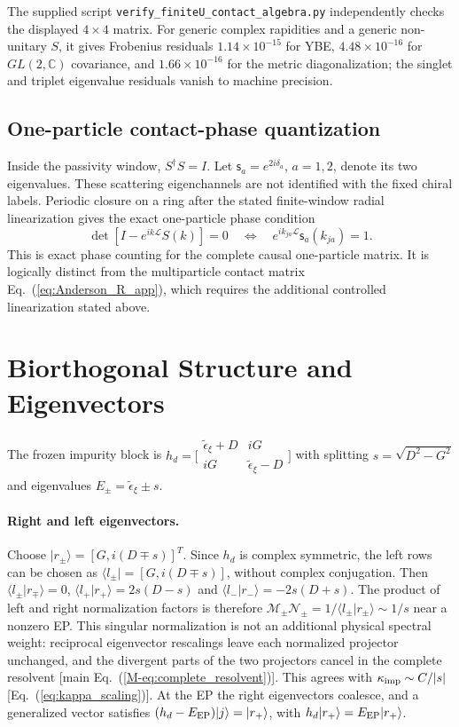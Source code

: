 \documentclass[%
  aps,physrev,onecolumn,10pt,amsmath,amssymb,superscriptaddress,longbibliography,floatfix
]{revtex4-2}
\newcommand{\teps}{\tilde{\epsilon}_{\xi}}
\newcommand{\keff}{\kappa_{\rm imp}}
\begin{document}
The supplied script \nolinkurl{verify_finiteU_contact_algebra.py} independently
checks the displayed \(4\times4\) matrix.  For generic complex rapidities and
a generic non-unitary \(S\), it gives Frobenius residuals
\(1.14\times10^{-15}\) for YBE,
\(4.48\times10^{-16}\) for \(GL(2,\mathbb C)\) covariance, and
\(1.66\times10^{-16}\) for the metric diagonalization; the singlet and triplet
eigenvalue residuals vanish to machine precision.

\subsection{One-particle contact-phase quantization}

Inside the passivity window, $S^\dagger S=I$.  Let
$\mathsf{s}_a=e^{2i\delta_a}$, $a=1,2$, denote its two eigenvalues.
These scattering eigenchannels are not identified with the fixed chiral
labels.  Periodic closure on a ring after the stated finite-window radial
linearization gives the exact one-particle phase condition
\begin{equation}
\det[I-e^{ik\mathcal L}S(k)]=0
\quad\Longleftrightarrow\quad
e^{ik_{ja}\mathcal L}\mathsf{s}_a(k_{ja})=1 .
\label{eq:S_full_quantization}
\end{equation}
This is exact phase counting for the complete causal one-particle matrix.
It is logically distinct from the multiparticle contact matrix
Eq.~(\ref{eq:Anderson_R_app}), which requires the additional controlled
linearization stated above.

\section{Biorthogonal Structure and Eigenvectors}
\label{app:biorth}

The frozen impurity block is
$h_d=\bigl[\begin{smallmatrix}
\teps+D&iG\\iG&\teps-D\end{smallmatrix}\bigr]$
with splitting $s=\sqrt{D^2-G^2}$ and eigenvalues
$E_\pm=\teps\pm s$.

\paragraph{Right and left eigenvectors.}
Choose $|r_\pm\rangle=[G,i(D\mp s)]^T$.  Since $h_d$ is complex
symmetric, the left rows can be chosen as
$\langle l_\pm|=[G,i(D\mp s)]$, without complex conjugation.
Then $\langle l_\pm|r_\mp\rangle=0$,
$\langle l_+|r_+\rangle=2s(D-s)$ and $\langle l_-|r_-\rangle=-2s(D+s)$.
The product of left and right normalization factors is therefore $\mathcal M_\pm\mathcal N_\pm=1/\langle l_\pm|r_\pm\rangle\sim1/s$
near a nonzero EP.  This singular normalization is not an additional physical
spectral weight: reciprocal eigenvector rescalings leave each normalized
projector unchanged, and the divergent parts of the two projectors cancel in
the complete resolvent [main Eq.~(\ref{M-eq:complete_resolvent})].  This agrees
with $\keff\sim C/|s|$ [Eq.~(\ref{eq:kappa_scaling})].
At the EP the right eigenvectors coalesce, and a generalized vector satisfies
$(h_d-E_{\rm EP})|j\rangle=|r_+\rangle$, with
$h_d|r_+\rangle=E_{\rm EP}|r_+\rangle$.
\end{document}
